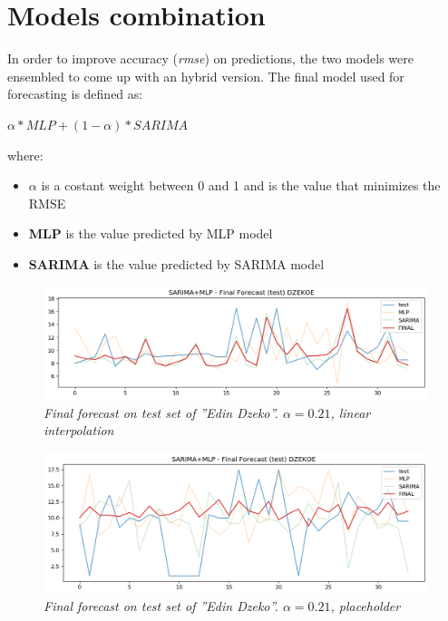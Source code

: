 \section{Models combination}

In order to improve accuracy (\textit{rmse}) on predictions, the two models were ensembled to come up with an hybrid version.
The final model used for forecasting is defined as:
\\
\begin{center}
  $\alpha * MLP + (1 - \alpha) * SARIMA$
\end{center}
where:
\begin{itemize}
    \item \textbf{$\alpha$} is a costant weight between 0 and 1 and is the value that minimizes the RMSE
    \item \textbf{MLP} is the value predicted by MLP model
    \item \textbf{SARIMA}  is the value predicted by SARIMA model 
\end{itemize}


\begin{figure}[H]
  \includegraphics[scale=0.5]{images/dzeko_final_forecast.png}
   \caption{\textit{Final forecast on test set of ''Edin Dzeko''. $\alpha  = 0.21$, \textit{linear interpolation}}}
  \label{fig:mlp}
\end{figure}

\begin{figure}[H]
  \includegraphics[scale=0.5]{images/dzeko_final_forecast_placeholder.png}
   \caption{\textit{Final forecast on test set of ''Edin Dzeko''. $\alpha  = 0.21$, \textit{placeholder}}}
  \label{fig:mlp}
\end{figure}



